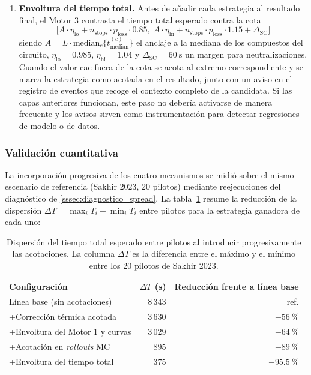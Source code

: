 \begin{enumerate}
    \item \textbf{Envoltura del tiempo total.} Antes de añadir cada estrategia al resultado final, el Motor 3 contrasta el tiempo total esperado contra la cota
    \begin{equation}
        \bigl[A \cdot \eta_\text{lo} + n_\text{stops} \cdot p_\text{loss} \cdot 0.85,\;
              A \cdot \eta_\text{hi} + n_\text{stops} \cdot p_\text{loss} \cdot 1.15 + \Delta_\text{SC}\bigr]
        \label{eq:total_clamp}
    \end{equation}
    siendo $A = L \cdot \mathrm{median}_c\{t^{(c)}_\text{median}\}$ el anclaje a la mediana de los compuestos del circuito, $\eta_\text{lo} = 0.985$, $\eta_\text{hi} = 1.04$ y $\Delta_\text{SC} = 60~\si{\second}$ un margen para neutralizaciones. Cuando el valor cae fuera de la cota se acota al extremo correspondiente y se marca la estrategia como acotada en el resultado, junto con un aviso en el registro de eventos que recoge el contexto completo de la candidata. Si las capas anteriores funcionan, este paso no debería activarse de manera frecuente y los avisos sirven como instrumentación para detectar regresiones de modelo o de datos.
\end{enumerate}

\subsubsection{Validación cuantitativa}
\label{sssec:envoltura_validacion}

La incorporación progresiva de los cuatro mecanismos se midió sobre el mismo escenario de referencia (Sakhir 2023, 20 pilotos) mediante reejecuciones del diagnóstico de \ref{sssec:diagnostico_spread}. La tabla~\ref{tab:envoltura_validacion} resume la reducción de la dispersión $\Delta T = \max_i T_i - \min_i T_i$ entre pilotos para la estrategia ganadora de cada uno:

\begin{table}[h]
\centering
\caption{Dispersión del tiempo total esperado entre pilotos al introducir progresivamente las acotaciones. La columna $\Delta T$ es la diferencia entre el máximo y el mínimo entre los 20 pilotos de Sakhir 2023.}
\label{tab:envoltura_validacion}
\begin{tabular}{lrr}
\toprule
Configuración & $\Delta T$ (s) & Reducción frente a línea base \\
\midrule
Línea base (sin acotaciones) & 8\,343 & ref. \\
\;+\;Corrección térmica acotada       & 3\,630 & $-56~\%$ \\
\;+\;Envoltura del Motor 1 y curvas    & 3\,029 & $-64~\%$ \\
\;+\;Acotación en \textit{rollouts} MC &    895 & $-89~\%$ \\
\;+\;Envoltura del tiempo total        &    375 & $-95.5~\%$ \\
\bottomrule
\end{tabular}
\end{table}


